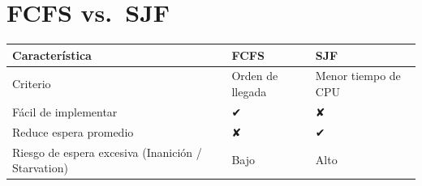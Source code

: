 \documentclass[
  spanish,
  letterpaper,
]{scrbook}
\newcounter{none} %
\begin{document}

\chapter{FCFS vs.~SJF}\label{fcfs-vs.-sjf}

{\def\LTcaptype{none} %
\begin{longtable}[]{@{}lll@{}}
\toprule\noalign{}
Característica & FCFS & SJF \\
\midrule\noalign{}
\endhead
\bottomrule\noalign{}
\endlastfoot
Criterio & Orden de llegada & Menor tiempo de CPU \\
Fácil de implementar & ✔ & ✘ \\
Reduce espera promedio & ✘ & ✔ \\
Riesgo de espera excesiva (Inanición / Starvation) & Bajo & Alto \\
\end{longtable}
}
\end{document}
